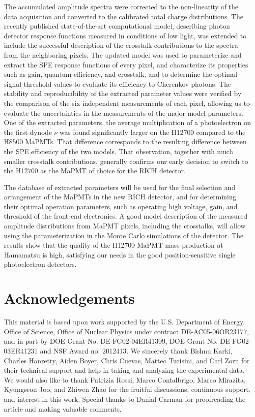 The accumulated amplitude spectra were corrected to the non-linearity of the data acquisition and converted to the calibrated total charge distributions. The recently published state-of-the-art computational model, describing photon detector response functions measured in conditions of low light, was extended to include the successful description of the crosstalk contributions to the spectra from the neighboring pixels. The updated model was used to parameterize and extract the SPE response functions of every pixel, and characterize its properties such as gain, quantum efficiency, and crosstalk, and to determine the optimal signal threshold values to evaluate its efficiency to Cherenkov photons. The stability and reproducibility of the extracted parameter values were verified by the comparison of the six independent measurements of each pixel, allowing us to evaluate the uncertainties in the measurements of the major model parameters. One of the extracted parameters, the average multiplication of a photoelectron on the first dynode $\nu$ was found significantly larger on the H12700 compared to the H8500 MaPMTs. That difference corresponds to the resulting difference between the SPE efficiency of the two models.  That observation, together with much smaller crosstalk contributions, generally confirms our early decision to switch to the H12700 as the MaPMT of choice for the RICH detector.

The database of extracted parameters will be used for the final selection and arrangement of the MaPMTs in the new RICH detector, and for determining their optimal operation parameters, such as operating high voltage, gain, and threshold of the front-end electronics. A good model description of the measured amplitude distributions from MaPMT pixels, including the crosstalks, will allow using the parameterization in the Monte Carlo simulations of the detector. The results show that the quality of the H12700 MaPMT mass production at Hamamatsu is high, satisfying our needs in the good position-sensitive single photoelectron detectors.



\section*{Acknowledgements}
This material is based upon work supported by the U.S. Department of Energy, Office of Science, Office of Nuclear Physics under contract DE-AC05-06OR23177, and in part by DOE Grant No. DE-FG02-04ER41309, DOE Grant No. DE-FG02-03ER41231 and NSF Award no: 2012413. 
We sincerely thank 
Bishnu Karki,
Charles Hanretty,
Aiden Boyer,
Chris  Cuevas,
Matteo Turisini, and
Carl Zorn
for their technical support and help in taking and analyzing the experimental data. We would
also like to thank 
Patrizia Rossi, 
Marco Contalbrigo, 
Marco Mirazita,
Kyungseon Joo,
and Zhiwen Zhao
for the fruitful discussions, continuous support, and interest in this work. Special thanks to Danial Carman for proofreading the article and making valuable comments.